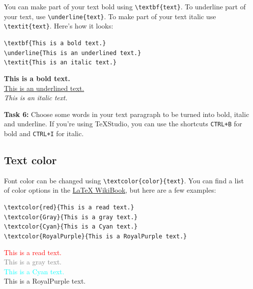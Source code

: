 \documentclass[12pts]{article}
\begin{document}
	You can make part of your text bold using \verb|\textbf{text}|. To 	underline part of your text, use \verb|\underline{text}|. To make part of your text italic use \verb|\textit{text}|. Here's how it looks:
	
	\begin{center}
		\begin{multicols}{2}
			\verb|\textbf{This is a bold text.}| \\
			\verb|\underline{This is an underlined text.}| \\
			\verb|\textit{This is an italic text.}| \\
			
			\columnbreak
			
			\textbf{This is a bold text.} \\
			\underline{This is an underlined text.} \\
			\textit{This is an italic text.}
		\end{multicols}
	\end{center}
	
	\textcolor{BurntOrange}{\textbf{Task 6:}} Choose some words in your text paragraph to be turned into bold, italic and underline. If you're using TeXStudio, you can use the shortcuts \texttt{CTRL+B} for bold and \texttt{CTRL+I} for italic.
	
	\subsection{Text color}
	Font color can be changed using \verb|\textcolor{color}{text}|. You can find a list of color options in the \href{https://en.wikibooks.org/wiki/LaTeX/Colors}{{\LaTeX} WikiBook}, but here are a few examples:
	
	
	\clearpage
	\begin{center}
		\begin{multicols}{2}
			\verb|\textcolor{red}{This is a read text.}| \\
			\verb|\textcolor{Gray}{This is a gray text.}| \\
			\verb|\textcolor{Cyan}{This is a Cyan text.}| \\
			\verb|\textcolor{RoyalPurple}{This is a RoyalPurple text.}|
			
			\columnbreak
			
			\textcolor{red}{This is a read text.} \\
			\textcolor{Gray}{This is a gray text.} \\
			\textcolor{Cyan}{This is a Cyan text.} \\
			\textcolor{RoyalPurple}{This is a RoyalPurple text.}
		\end{multicols}
	\end{center}
	
\end{document}
